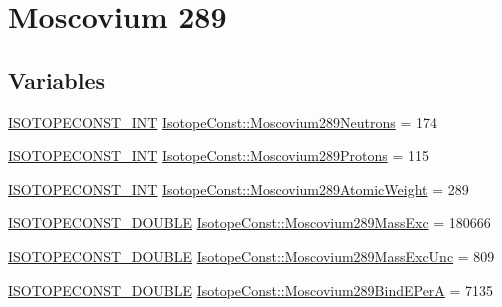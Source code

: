 \hypertarget{group___isotope_const-_moscovium-_mc289}{}\section{Moscovium 289}
\label{group___isotope_const-_moscovium-_mc289}
\subsection*{Variables}
\begin{DoxyCompactItemize}
\item 
\mbox{\hyperlink{group___isotope_const-_macros_ga5f18360b3e99483a35c32d789e62621c}{I\+S\+O\+T\+O\+P\+E\+C\+O\+N\+S\+T\+\_\+\+I\+NT}} \mbox{\hyperlink{group___isotope_const-_moscovium-_mc289_gaec9622dfd071a0acdab7cbf10e1e957f}{Isotope\+Const\+::\+Moscovium289\+Neutrons}} = 174
\item 
\mbox{\hyperlink{group___isotope_const-_macros_ga5f18360b3e99483a35c32d789e62621c}{I\+S\+O\+T\+O\+P\+E\+C\+O\+N\+S\+T\+\_\+\+I\+NT}} \mbox{\hyperlink{group___isotope_const-_moscovium-_mc289_gae37d75ea6781d6a774b2f0d74f0eadad}{Isotope\+Const\+::\+Moscovium289\+Protons}} = 115
\item 
\mbox{\hyperlink{group___isotope_const-_macros_ga5f18360b3e99483a35c32d789e62621c}{I\+S\+O\+T\+O\+P\+E\+C\+O\+N\+S\+T\+\_\+\+I\+NT}} \mbox{\hyperlink{group___isotope_const-_moscovium-_mc289_gaeb308cb120a2217869c6561dac5d5084}{Isotope\+Const\+::\+Moscovium289\+Atomic\+Weight}} = 289
\item 
\mbox{\hyperlink{group___isotope_const-_macros_ga8f45a7272ce02c0b4c65c44636ed719a}{I\+S\+O\+T\+O\+P\+E\+C\+O\+N\+S\+T\+\_\+\+D\+O\+U\+B\+LE}} \mbox{\hyperlink{group___isotope_const-_moscovium-_mc289_ga71dd06141646c9cfd76c075c08191e6b}{Isotope\+Const\+::\+Moscovium289\+Mass\+Exc}} = 180666
\item 
\mbox{\hyperlink{group___isotope_const-_macros_ga8f45a7272ce02c0b4c65c44636ed719a}{I\+S\+O\+T\+O\+P\+E\+C\+O\+N\+S\+T\+\_\+\+D\+O\+U\+B\+LE}} \mbox{\hyperlink{group___isotope_const-_moscovium-_mc289_gad0b6ef829c52885bc2ee0aabbf443642}{Isotope\+Const\+::\+Moscovium289\+Mass\+Exc\+Unc}} = 809
\item 
\mbox{\hyperlink{group___isotope_const-_macros_ga8f45a7272ce02c0b4c65c44636ed719a}{I\+S\+O\+T\+O\+P\+E\+C\+O\+N\+S\+T\+\_\+\+D\+O\+U\+B\+LE}} \mbox{\hyperlink{group___isotope_const-_moscovium-_mc289_gafa70b3010e7425bf54010ff4ee2a59a0}{Isotope\+Const\+::\+Moscovium289\+Bind\+E\+PerA}} = 7135
\item 

\end{DoxyCompactItemize}
